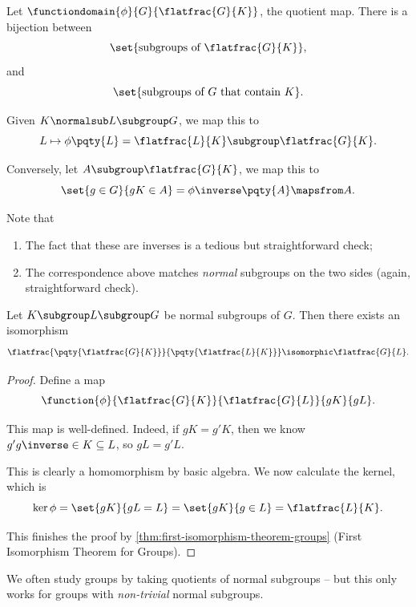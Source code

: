 \begin{remark}
    Let \(\functiondomain{\phi}{G}{\flatfrac{G}{K}}\), the quotient map. There is a bijection between
    \[
        \set{\text{subgroups of }\flatfrac{G}{K}},
    \]
    and
    \[
        \set{\text{subgroups of }G\text{ that contain }K}.
    \]

    Given \(K \normalsub L \subgroup G\), we map this to
    \[
        L \mapsto \phi\pqty{L} = \flatfrac{L}{K} \subgroup \flatfrac{G}{K}.
    \]

    Conversely, let \(A \subgroup \flatfrac{G}{K}\), we map this to
    \[
        \set{g \in G}{gK \in A} = \phi\inverse\pqty{A} \mapsfrom A.
    \]

    Note that
    \begin{enumerate}
        \item The fact that these are inverses is a tedious but straightforward check;
        \item The correspondence above matches \emph{normal} subgroups on the two sides (again, straightforward check).
    \end{enumerate}
\end{remark}

\begin{theorem}
    \label{thm:third-isomorphism-theorem-groups}%
    Let \(K \subgroup L \subgroup G\) be normal subgroups of \(G\). Then there exists an isomorphism
    \[
        \flatfrac{\pqty{\flatfrac{G}{K}}}{\pqty{\flatfrac{L}{K}}} \isomorphic \flatfrac{G}{L}.
    \]
\end{theorem}

\begin{proof}
    Define a map
    \[
        \function{\phi}{\flatfrac{G}{K}}{\flatfrac{G}{L}}{gK}{gL}.
    \]

    This map is well-defined. Indeed, if \(gK = g'K\), then we know \(g' g\inverse \in K \subseteq L\), so \(gL = g'L\).

    This is clearly a homomorphism by basic algebra. We now calculate the kernel, which is
    \[
        \ker \phi = \set{gK}{gL = L} = \set{gK}{g \in L} = \flatfrac{L}{K}.
    \]

    This finishes the proof by \autoref{thm:first-isomorphism-theorem-groups} (First Isomorphism Theorem for Groups).
\end{proof}

We often study groups by taking quotients of normal subgroups -- but this only works for groups with \emph{non-trivial} normal subgroups.

